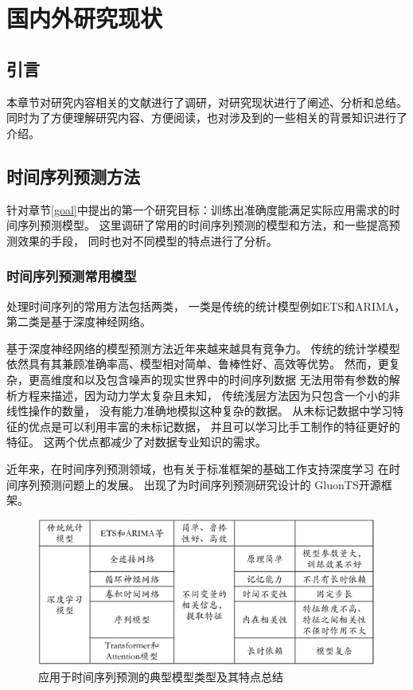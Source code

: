
\chapter{国内外研究现状}\label{chapter2}
\section{引言}
本章节对研究内容相关的文献进行了调研，对研究现状进行了阐述、分析和总结。
同时为了方便理解研究内容、方便阅读，也对涉及到的一些相关的背景知识进行了介绍。
\section{时间序列预测方法}
  针对章节\ref{goal}中提出的第一个研究目标：训练出准确度能满足实际应用需求的时间序列预测模型。
  这里调研了常用的时间序列预测的模型和方法，和一些提高预测效果的手段，
  同时也对不同模型的特点进行了分析。
\subsection{时间序列预测常用模型}

  处理时间序列的常用方法包括两类，
  一类是传统的统计模型例如ETS和ARIMA，第二类是基于深度神经网络。

  基于深度神经网络的模型预测方法近年来越来越具有竞争力。
  传统的统计学模型依然具有其兼顾准确率高、模型相对简单、鲁棒性好、高效等优势。
  然而，更复杂，更高维度和以及包含噪声的现实世界中的时间序列数据
  无法用带有参数的解析方程来描述，因为动力学太复杂且未知，
  传统浅层方法因为只包含一个小的非线性操作的数量，
  没有能力准确地模拟这种复杂的数据。
  从未标记数据中学习特征的优点是可以利用丰富的未标记数据，
  并且可以学习比手工制作的特征更好的特征。
  这两个优点都减少了对数据专业知识的需求。

  近年来，在时间序列预测领域，也有关于标准框架的基础工作支持深度学习
  在时间序列预测问题上的发展。
  出现了为时间序列预测研究设计的
  GluonTS开源框架\cite{DBLP:journals/corr/abs-1906-05264}。

  \begin{figure}
    \centering
    \includegraphics[width=\linewidth]{figures/预测典型模型.png}
    \caption{应用于时间序列预测的典型模型类型及其特点总结}
    \label{tab:prediction models}
  \end{figure}

